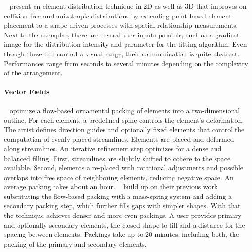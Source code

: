 

\citeauthor*{landes_2013_asm}~\cite{landes_2013_asm} present an element distribution technique in 2D as well as 3D that improves on collision-free and anisotropic distributions by extending point based element placement to a shape-driven processes with spatial relationship measurements. Next to the exemplar, there are several user inputs possible, such as a gradient image for the distribution intensity and parameter for the fitting algorithm. Even though these can control a visual range, their communication is quite abstract. Performances range from seconds to several minutes depending on the complexity of the arrangement. 


\paragraph*{Vector Fields}
\label{para:analysis_element_arrangements_vector}

\citeauthor*{saputra_2017_ffo}~\cite{saputra_2017_ffo} optimize a flow-based ornamental packing of elements into a two-dimensional outline. For each element, a predefined spine controls the element's deformation. The artist defines direction guides and optionally fixed elements that control the computation of evenly placed streamlines. Elements are placed and deformed along streamlines. An iterative refinement step optimizes for a dense and balanced filling. First, streamlines are slightly shifted to cohere to the space available. Second, elements a re-placed with rotational adjustments and possible overlaps into free space of neighboring elements, reducing negative space. An average packing takes about an hour. \citeauthor*{saputra_2018_rde}~\cite{saputra_2018_rde} build up on their previous work substituting the flow-based packing with a mass-spring system and adding a secondary packing step, which further fills gaps with simpler shapes. With that the technique achieves denser and more even packings. A user provides primary and optionally secondary elements, the closed shape to fill and a distance for the spacing between elements. Packings take up to 20 minutes, including both, the packing of the primary and secondary elements.



